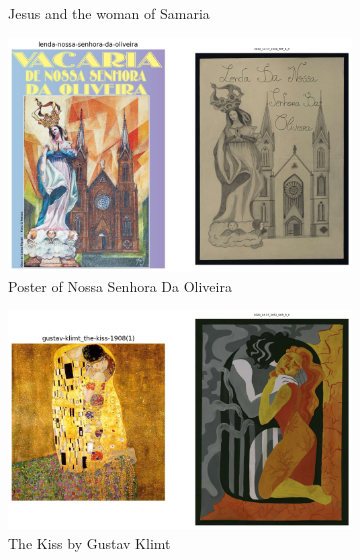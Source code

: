 \begin{figure}
\begin{subfigure}[b]{0.45\textwidth}
         \caption{Jesus and the woman of Samaria}
     \end{subfigure}
     \hfil
     \begin{subfigure}[b]{0.45\textwidth}
         \centering
         \includegraphics[width=\textwidth]{images/example_pairs/lenda-nossa-senhora-da-oliveira.png}
         \caption{Poster of Nossa Senhora Da Oliveira}
     \end{subfigure}
     \hfil
     \begin{subfigure}[b]{0.45\textwidth}
         \centering
         \includegraphics[width=\textwidth]{images/example_pairs/gustav-klimt_the-kiss-1908(1).png}
         \caption{The Kiss by Gustav Klimt}
     \end{subfigure}
     \hfil
     \begin{subfigure}[b]{0.45\textwidth}
         \centering

\end{subfigure}
\end{figure}
